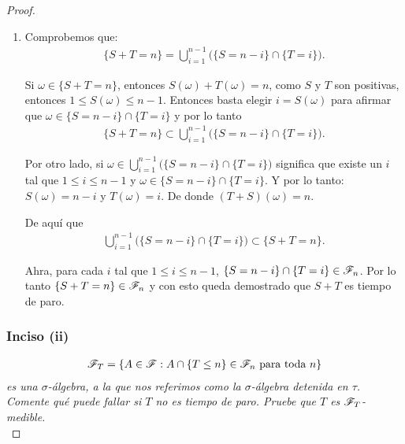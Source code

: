 \begin{proof}
\begin{enumerate}
				Por último, $\{ T \leq n \} \in \F_n$ y $\{ S \leq n \} \in \F_n$. Por lo tanto	\\	
				$\{ T \leq n \} \cap \{ S \leq n\} = \{ S \vee T \leq n \} \in \F_n$ y con esto demostramos que 
				$ S \vee T$ es tiempo de paro.\\
				
			\item
				Comprobemos que:
				\begin{align}
					\{ S + T = n \} = \bigcup_{i = 1}^{n-1} \bigg( \{S = n - i\} \cap \{T = i\} \bigg).
				\end{align}
				
				Si $\omega \in \{ S + T = n \}$, entonces $S(\omega) + T(\omega) = n$, como $S$ y $T$ son positivas,
				entonces $1 \leq S(\omega) \leq n-1$. Entonces basta elegir $i = S(\omega)$ para afirmar que 
				$\omega \in \{S = n - i\} \cap \{T = i\}$ y por lo tanto
				\begin{align}
				\{ S + T = n \} \subset \bigcup_{i = 1}^{n-1} \bigg( \{S = n - i\} \cap \{T = i\} \bigg).
				\end{align}
				
				Por otro lado, si $\omega \in \bigcup_{i = 1}^{n-1} \bigg( \{S = n - i\} \cap \{T = i\} \bigg)$
				significa que existe un $i$ tal que $1\leq i \leq n-1$ y $\omega \in \{S = n - i\} \cap \{T = i\}$.
				Y por lo tanto: $S(\omega) = n-i$ y $T(\omega) = i$. De donde $(T + S)(\omega) = n$.
				
				De aquí que
				\begin{align}
					\bigcup_{i = 1}^{n-1} \bigg( \{S = n - i\} \cap \{T = i\} \bigg) \subset \{ S + T = n \}. 
				\end{align}
				
				Ahra, para cada $i$ tal que $1 \leq i \leq n-1$, $\{S = n - i\} \cap \{T = i\} \in \mathscr{F}_n$.
				Por lo tanto $\{ S + T = n\} \in \mathscr{F}_n$ y con esto queda demostrado que $ S + T $ es tiempo de paro.
		\end{enumerate}
		
	\subsubsection{Inciso (ii)}
	\emph{
		\begin{align}
			\mathscr{F}_T=\left\{ A\in\mathscr{F}:A\cap\left\{ T\leq n\right\} \in\mathscr{F}_n\text{ para toda } n\right\} 
		\end{align}
		es una $\sigma$-\'algebra, 
		a la que nos referimos como la $\sigma$-\'algebra detenida en $\tau$. Comente qu\'e puede fallar si $T$ no es tiempo de paro. 
		Pruebe que $T$ es $\mathscr{F}_T$-medible.\\		
	}			
			

\end{proof}
